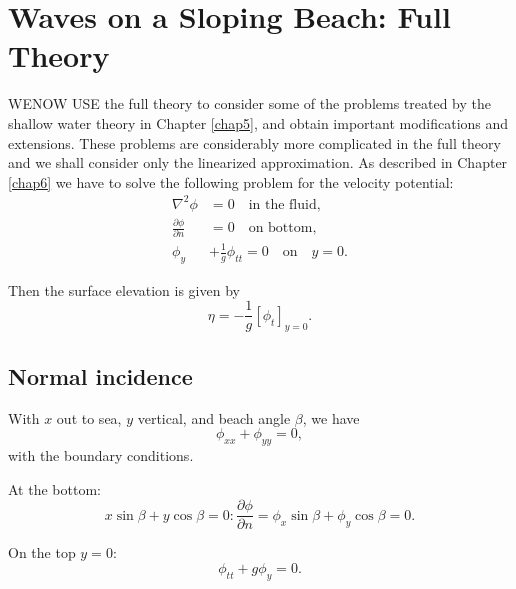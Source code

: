
\chapter{Waves on a Sloping Beach: Full Theory}\label{chap7}

WE\pageoriginale NOW USE the full theory to consider some of the problems treated by the shallow water theory in Chapter \ref{chap5}, and obtain important modifications and extensions. These problems are considerably more complicated in the full theory and we shall consider only the linearized approximation. As described in Chapter \ref{chap6} we have to solve the following problem for the velocity potential:
\begin{align}
\nabla^2\phi &=0\quad\text{in the fluid},\tag{7.1}\label{chap7:eq7.1}\\
\frac{\partial\phi}{\partial n} &=0\quad\text{on bottom}, \tag{7.2}\label{chap7:eq7.2}\\
\phi_y&+\frac{1}{g}\phi_{tt}=0\quad\text{on}\quad y=0.\tag{7.3}\label{chap7:eq7.3}
\end{align}

Then the surface elevation is given by 
\begin{equation}
\eta= -\frac{1}{g}\left[\phi_t\right]_{y=0}.\tag{7.4}\label{chap7:eq7.4}
\end{equation}

\section{Normal incidence}\label{chap7:sec7.1}

With $x$ out to sea, $y$ vertical, and beach angle $\beta$, we have 
\begin{equation}
\phi_{xx}+\phi_{yy}=0,\tag{7.5}\label{chap7:eq7.5}
\end{equation}
with the boundary conditions.

At the bottom:
\begin{equation}
x\sin\beta +y\cos\beta =0:\frac{\partial\phi}{\partial n}=\phi_x\sin\beta + \phi_y\cos\beta =0.\tag{7.6}\label{chap7:eq7.6}
\end{equation}

On the top $y=0$:
\begin{equation}
\phi_{tt}+g\phi_y=0.\tag{7.7}\label{chap7:eq7.7}
\end{equation}\pageoriginale

